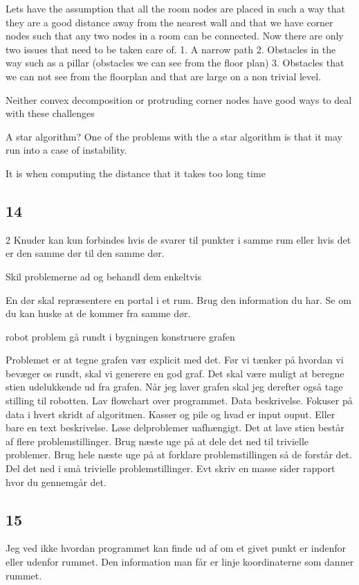 Lets have the assumption that all the room nodes are placed in such a way that they are a good distance away from the nearest wall and
that we have corner nodes such that any two nodes in a room can be connected. 
Now there are only two issues that need to be taken care of.
1. A narrow path
2. Obstacles in the way such as a pillar (obstacles we can see from the floor plan)
3. Obstacles that we can not see from the floorplan and that are large on a non trivial level.

Neither convex decomposition or protruding corner nodes have good ways to deal with these challenges

A star algorithm?
One of the problems with the a star algorithm is that it may run into a case of instability.

It is when computing the distance that it takes too long time


\subsection{14}
2 Knuder kan kun forbindes hvis de svarer til punkter i samme rum eller hvis det er den samme dør til den samme dør.

Skil problemerne ad og behandl dem enkeltvis

En dør skal repræsentere en portal i et rum.
Brug den information du har. Se om du kan huske at de kommer fra samme dør.


robot problem
gå rundt i bygningen 
konstruere grafen

Problemet er at tegne grafen vær explicit med det.
Før vi tænker på hvordan vi bevæger os rundt, skal vi generere en god graf. Det skal være muligt at beregne stien udelukkende ud fra grafen.
Når jeg laver grafen skal jeg derefter også tage stilling til robotten.
Lav flowchart over programmet.
Data beskrivelse.
Fokuser på data i hvert skridt af algoritmen.
Kasser og pile og hvad er input ouput. Eller bare en text beskrivelse.
Løse delproblemer uafhængigt.
Det at lave stien består af flere problemstillinger.
Brug næste uge på at dele det ned til trivielle problemer. 
Brug hele næste uge på at forklare problemstillingen så de forstår det. Del det ned i små trivielle problemstillinger.
Evt skriv en masse sider rapport hvor du gennemgår det.


\subsection{15}
Jeg ved ikke hvordan programmet kan finde ud af om et givet punkt er indenfor eller udenfor rummet. Den information man får er linje koordinaterne som danner rummet.

